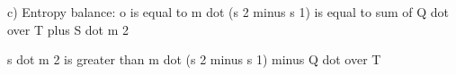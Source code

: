 c) Entropy balance: 
o is equal to m dot (s 2 minus s 1) is equal to sum of Q dot over T plus S dot m 2

s dot m 2 is greater than m dot (s 2 minus s 1) minus Q dot over T